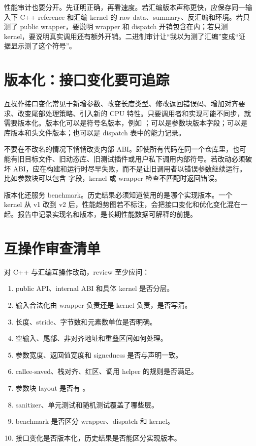 性能审计也要分开。先证明正确，再看速度。若汇编版本声称更快，应保存同一输入下 C++ reference 和汇编 kernel 的 raw data、summary、反汇编和环境。若只测了 public wrapper，要说明 wrapper 和 dispatch 开销包含在内；若只测 kernel，要说明真实调用还有额外开销。二进制审计让“我以为测了汇编”变成“证据显示测了这个符号”。

\section{版本化：接口变化要可追踪}

互操作接口变化常见于新增参数、改变长度类型、修改返回错误码、增加对齐要求、改变尾部处理策略、引入新的 CPU 特性。只要调用者和实现可能不同步，就需要版本化。版本化可以是符号名版本，例如 ；可以是参数块版本字段；可以是库版本和头文件版本；也可以是 dispatch 表中的能力记录。

不要在不改名的情况下悄悄改变内部 ABI。即使所有代码在同一个仓库里，也可能有旧目标文件、旧动态库、旧测试插件或用户私下调用内部符号。若改动必须破坏 ABI，应在构建和运行时尽早失败，而不是让旧调用者以错误参数继续运行。比如参数块可以包含  字段，kernel 或 wrapper 检查不匹配时返回错误。

版本化还服务 benchmark。历史结果必须知道使用的是哪个实现版本。一个 kernel 从 v1 改到 v2 后，性能趋势图若不标注，会把接口变化和优化变化混在一起。报告中记录实现名和版本，是长期性能数据可解释的前提。

\section{互操作审查清单}

对 C++ 与汇编互操作改动，review 至少应问：

\begin{enumerate}
  \item public API、internal ABI 和具体 kernel 是否分层。
  \item 输入合法化由 wrapper 负责还是 kernel 负责，是否写清。
  \item 长度、stride、字节数和元素数单位是否明确。
  \item 空输入、尾部、非对齐地址和重叠区间如何处理。
  \item 参数宽度、返回值宽度和 signedness 是否与声明一致。
  \item callee-saved、栈对齐、红区、调用 helper 的规则是否满足。
  \item 参数块 layout 是否有 。
  \item sanitizer、单元测试和随机测试覆盖了哪些层。
  \item benchmark 是否区分 wrapper、dispatch 和 kernel。
  \item 接口变化是否版本化，历史结果是否能区分实现版本。
\end{enumerate}

